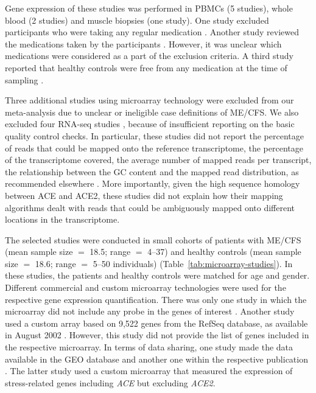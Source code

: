 Gene expression of these studies was performed in PBMCs (5 studies), whole blood (2 studies) and muscle biopsies (one study). One study excluded participants who were taking any regular medication \citep{gowGeneSignaturePostinfectious2009}. Another study reviewed the medications taken by the participants \citep{smithConvergentGenomicStudies2011}. However, it was unclear which medications were considered as a part of the exclusion criteria. A third study reported that healthy controls were free from any medication at the time of sampling \citep{saikiIdentificationMarkerGenes2008}.

Three additional studies using microarray technology \citep{vernon2002UtilityBlood, galbraith2011PeripheralBlood, nguyen2017WholeBlood} were excluded from our meta-analysis due to unclear or ineligible case definitions of ME/CFS. We also excluded four RNA-seq studies \citep{bouquetRNASeqAnalysisGene2017, bouquetWholeBloodHuman2019, sweetman2019ChangesTranscriptome, raijmakersPossibleRoleMitochondrialderived2019}, because of insufficient reporting on the basic quality control checks. In particular, these studies did not report the percentage of reads that could be mapped onto the reference transcriptome, the percentage of the transcriptome covered, the average number of mapped reads per transcript, the relationship between the GC content and the mapped read distribution, as recommended elsewhere \citep{conesa2016SurveyBest}. More importantly, given the high sequence homology between ACE and ACE2, these studies did not explain how their mapping algorithms dealt with reads that could be ambiguously mapped onto different locations in the transcriptome.

The selected studies were conducted in small cohorts of patients with ME/CFS (mean sample size $=$ 18.5; range $=$ 4--37) and healthy controls (mean sample size $=$ 18.6; range $=$ 5--50 individuals) (Table~\ref{tab:microarray-studies}). In these studies, the patients and healthy controls were matched for age and gender. Different commercial and custom microarray technologies were used for the respective gene expression quantification. There was only one study in which the microarray did not include any probe in the genes of interest \citep{whistlerExerciseResponsiveGenes2005}. Another study used a custom array based on 9,522 genes from the RefSeq database, as available in August 2002 \citep{kaushik2005GeneExpression}. However, this study did not provide the list of genes included in the respective microarray. In terms of data sharing, one study made the data available in the GEO database \citep{gowGeneSignaturePostinfectious2009} and another one within the respective publication \citep{saikiIdentificationMarkerGenes2008}. The latter study used a custom microarray that measured the expression of stress-related genes including \textit{ACE} but excluding \textit{ACE2}.

